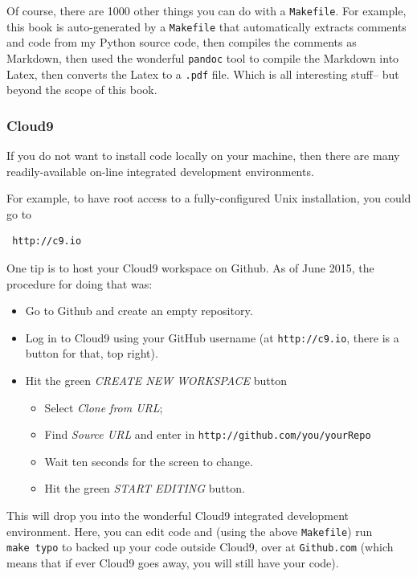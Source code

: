 Of course, there are 1000 other things you can do with a
\texttt{Makefile}. For example, this book is auto-generated by a
\texttt{Makefile} that automatically extracts comments and code from my
Python source code, then compiles the comments as Markdown, then used
the wonderful \texttt{pandoc} tool to compile the Markdown into Latex,
then converts the Latex to a \texttt{.pdf} file. Which is all
interesting stuff-- but beyond the scope of this book.

\subsubsection{Cloud9}\label{cloud9}

If you do not want to install code locally on your machine, then there
are many readily-available on-line integrated development environments.

For example, to have root access to a fully-configured Unix
installation, you could go to

\begin{lstlisting}
 http://c9.io
\end{lstlisting}

One tip is to host your Cloud9 workspace on Github. As of June 2015, the
procedure for doing that was:

\begin{itemize}
\itemsep1pt\parskip0pt
\item
  Go to Github and create an empty repository.
\item
  Log in to Cloud9 using your GitHub username (at \texttt{http://c9.io},
  there is a button for that, top right).
\item
  Hit the green \emph{CREATE NEW WORKSPACE} button

  \begin{itemize}
  \itemsep1pt\parskip0pt
  \item
    Select \emph{Clone from URL};
  \item
    Find \emph{Source URL} and enter in
    \texttt{http://github.com/you/yourRepo}
  \item
    Wait ten seconds for the screen to change.
  \item
    Hit the green \emph{START EDITING} button.
  \end{itemize}
\end{itemize}

This will drop you into the wonderful Cloud9 integrated development
environment. Here, you can edit code and (using the above
\texttt{Makefile}) run \texttt{make\ typo} to backed up your code
outside Cloud9, over at \texttt{Github.com} (which means that if ever
Cloud9 goes away, you will still have your code).

